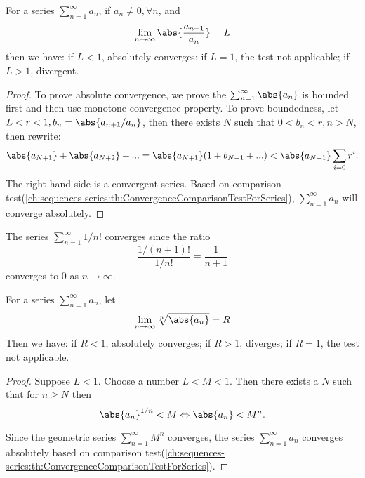 \begin{refsection}
\begin{theorem}\cite[86]{johnsonbaugh2010foundations}\label{ch:sequences-series:th:ratioTestForSeriesCnvergence}
For a series $\sum_{n=1}^\infty a_n$, if $a_n \neq 0, \forall n$, and $$\lim_{n\to \infty} \abs{\frac{a_{n+1}}{a_n}} = L$$
then we have: if $L<1$, absolutely converges; if $L=1$, the test not applicable; if $L>1$, divergent.
\end{theorem}
\begin{proof}
 To prove absolute convergence, we prove the $\sum_{n=1}^\infty \abs{a_n}$ is bounded first and then use monotone convergence property. To prove boundedness, let $L<r<1, b_n = \abs{a_{n+1}/a_n}$, then there exists $N$ such that $0<b_n < r, n>N$, then rewrite:
 $$\abs{a_{N+1}}+\abs{a_{N+2}} + ... = \abs{a_{N+1}}(1 + b_{N+1} + ...) < \abs{a_{N+1}}\sum_{i=0} r^i.$$
 The right hand side is a convergent series. Based on comparison test(\autoref{ch:sequences-series:th:ConvergenceComparisonTestForSeries}), $\sum_{n=1}^\infty a_n$ will converge absolutely.
\end{proof}

\begin{example}
The series $\sum_{n=1}^\infty 1/n!$ converges since the ratio
$$\frac{1/(n+1)!}{1/n!} = \frac{1}{n+1}$$
converges to 0 as $n\to \infty$.	
\end{example}


\begin{theorem}\cite[85]{johnsonbaugh2010foundations}
For a series $\sum_{n=1}^\infty a_n$, let 
$$\lim_{n\to\infty} \sqrt[n]{\abs{a_n}} = R$$
Then we have: if $R < 1$, absolutely converges; if $R>1$, diverges; if $R=1$, the test not applicable.
\end{theorem}
\begin{proof}
Suppose $L<1$. Choose a number $L<M<1$. Then there exists a $N$ such that for $n \geq N$ then
$$\abs{a_n}^{1/n} < M \Leftrightarrow \abs{a_n} < M^n.$$

Since the geometric series $\sum_{n=1}^\infty M^n$ converges, the series $\sum_{n=1}^\infty a_n$ converges absolutely based on comparison test(\autoref{ch:sequences-series:th:ConvergenceComparisonTestForSeries}).	
\end{proof}


\end{refsection}

